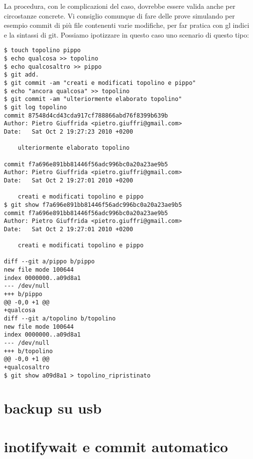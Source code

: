 \documentclass{article}
\begin{document}
La procedura, con le complicazioni del caso, dovrebbe essere valida anche per
circostanze concrete. Vi consiglio comunque di fare delle prove simulando per
esempio commit di più file contenenti varie modifiche, per far pratica con gl
indici e la sintassi di git.
Possiamo ipotizzare in questo caso uno scenario di questo tipo:

\begin{lstlisting}
$ touch topolino pippo
$ echo qualcosa >> topolino
$ echo qualcosaltro >> pippo
$ git add.
$ git commit -am "creati e modificati topolino e pippo"
$ echo "ancora qualcosa" >> topolino
$ git commit -am "ulteriormente elaborato topolino"
$ git log topolino
commit 87548d4cd43cda917cf788866abd76f8399b639b
Author: Pietro Giuffrida <pietro.giuffri@gmail.com>
Date:   Sat Oct 2 19:27:23 2010 +0200

    ulteriormente elaborato topolino

commit f7a696e891bb81446f56adc996bc0a20a23ae9b5
Author: Pietro Giuffrida <pietro.giuffri@gmail.com>
Date:   Sat Oct 2 19:27:01 2010 +0200

    creati e modificati topolino e pippo
$ git show f7a696e891bb81446f56adc996bc0a20a23ae9b5
commit f7a696e891bb81446f56adc996bc0a20a23ae9b5
Author: Pietro Giuffrida <pietro.giuffri@gmail.com>
Date:   Sat Oct 2 19:27:01 2010 +0200

    creati e modificati topolino e pippo

diff --git a/pippo b/pippo
new file mode 100644
index 0000000..a09d8a1
--- /dev/null
+++ b/pippo
@@ -0,0 +1 @@
+qualcosa
diff --git a/topolino b/topolino
new file mode 100644
index 0000000..a09d8a1
--- /dev/null
+++ b/topolino
@@ -0,0 +1 @@
+qualcosaltro
$ git show a09d8a1 > topolino_ripristinato
\end{lstlisting}

\section{backup su usb}
\section{inotifywait e commit automatico}
\end{document}
